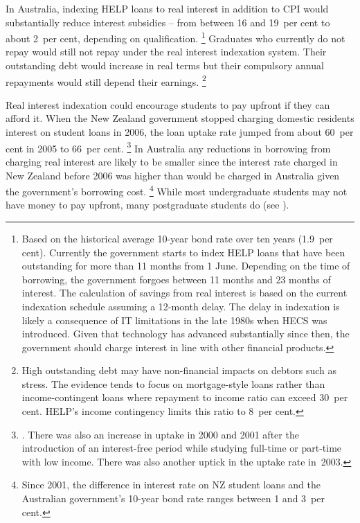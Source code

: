 \documentclass{grattan}
\begin{document}
In Australia, indexing \gls{HELP} loans to real interest in addition to \gls{CPI} would substantially reduce interest subsidies -- from between 16 and 19~per cent to about 2~per cent, depending on qualification.%
   \footnote{Based on the historical average 10-year bond rate over ten years (1.9~per cent).\label{fn:68-High-outstanding-debt-non-fin-impact}
Currently the government starts to index \gls{HELP} loans that have been outstanding for more than 11 months from 1 June.
Depending on the time of borrowing, the government forgoes between 11 months and 23 months of interest.
The calculation of savings from real interest is based on the current indexation schedule assuming a 12-month delay.
The delay in indexation is likely a consequence of IT limitations in the late 1980s when \gls{HECS} was introduced.
Given that technology has advanced substantially since then, the government should charge interest in line with other financial products.} Graduates who currently do not repay would still not repay under the real interest indexation system.
Their outstanding debt would increase in real terms but their compulsory annual repayments would still depend their earnings.%
   \footnote{High outstanding debt may have non-financial impacts on debtors such as stress.
The evidence tends to focus on mortgage-style loans rather than income-contingent loans where repayment to income ratio can exceed 30~per cent.
\gls{HELP}'s income contingency limits this ratio to 8~per cent.}

Real interest indexation could encourage students to pay upfront if they can afford it.
When the New Zealand government stopped charging domestic residents interest on student loans in 2006, the loan uptake rate jumped from about 60~per cent in 2005 to 66~per cent.%
   \footnote{\textcite[][23]{EducationNZ2013Studentloanscheme}. 
There was also an increase in uptake in 2000 and 2001 after the introduction of an interest-free period while studying full-time or part-time with low income.
There was also another uptick in the uptake rate in~2003.
} 
In Australia any reductions in borrowing from charging real interest are likely to be smaller since the interest rate charged in New Zealand before 2006 was higher than would be charged in Australia given the government's borrowing cost.%
   \footnote{Since 2001, the difference in interest rate on NZ student loans and the Australian government's 10-year bond rate ranges between 1 and 3~per cent.} 
While most undergraduate students may not have money to pay upfront, many postgraduate students do (see ).
\end{document}
